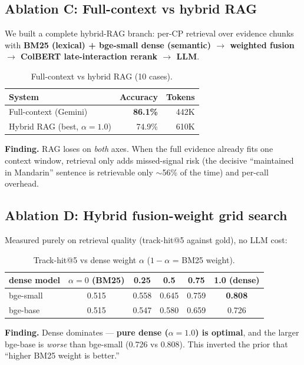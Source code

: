 \documentclass[11pt,a4paper]{article}
\begin{document}
\subsection{Ablation C: Full-context vs hybrid RAG}
We built a complete hybrid-RAG branch: per-CP retrieval over evidence chunks with \textbf{BM25 (lexical) + bge-small dense (semantic) $\to$ weighted fusion $\to$ ColBERT late-interaction rerank $\to$ LLM}.

\begin{table}[htbp]\centering\small
\caption{Full-context vs hybrid RAG (10 cases).}
\begin{tabular}{@{}lrr@{}}
\toprule
\textbf{System} & \textbf{Accuracy} & \textbf{Tokens} \\
\midrule
Full-context (Gemini) & \textbf{86.1\%} & 442K \\
Hybrid RAG (best, $\alpha=1.0$) & 74.9\% & 610K \\
\bottomrule
\end{tabular}
\end{table}

\textbf{Finding.} RAG loses on \emph{both} axes. When the full evidence already fits one context window, retrieval only adds missed-signal risk (the decisive ``maintained in Mandarin'' sentence is retrievable only $\sim$56\% of the time) and per-call overhead.

\subsection{Ablation D: Hybrid fusion-weight grid search}
Measured purely on retrieval quality (track-hit@5 against gold), no LLM cost:

\begin{table}[htbp]\centering\small
\caption{Track-hit@5 vs dense weight $\alpha$ ($1-\alpha$ = BM25 weight).}
\begin{tabular}{@{}lccccc@{}}
\toprule
\textbf{dense model} & $\alpha{=}0$ (BM25) & 0.25 & 0.5 & 0.75 & 1.0 (dense) \\
\midrule
bge-small & 0.515 & 0.558 & 0.645 & 0.759 & \textbf{0.808} \\
bge-base & 0.515 & 0.547 & 0.580 & 0.659 & 0.726 \\
\bottomrule
\end{tabular}
\end{table}

\textbf{Finding.} Dense dominates --- \textbf{pure dense ($\alpha=1.0$) is optimal}, and the larger bge-base is \emph{worse} than bge-small (0.726 vs 0.808). This inverted the prior that ``higher BM25 weight is better.''
\end{document}
